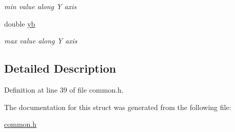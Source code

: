 \begin{DoxyCompactItemize}
\begin{DoxyCompactList}\small\item\em min value along Y axis \end{DoxyCompactList}\item 
\hypertarget{structSigSpatial2013_1_1Ring_a6b2f395698fc3585027ddacf363518a8}{double \hyperlink{structSigSpatial2013_1_1Ring_a6b2f395698fc3585027ddacf363518a8}{yb}}\label{structSigSpatial2013_1_1Ring_a6b2f395698fc3585027ddacf363518a8}

\begin{DoxyCompactList}\small\item\em max value along Y axis \end{DoxyCompactList}\end{DoxyCompactItemize}


\subsection{Detailed Description}


Definition at line 39 of file common.\-h.



The documentation for this struct was generated from the following file\-:\begin{DoxyCompactItemize}
\item 
\hyperlink{common_8h}{common.\-h}\end{DoxyCompactItemize}
